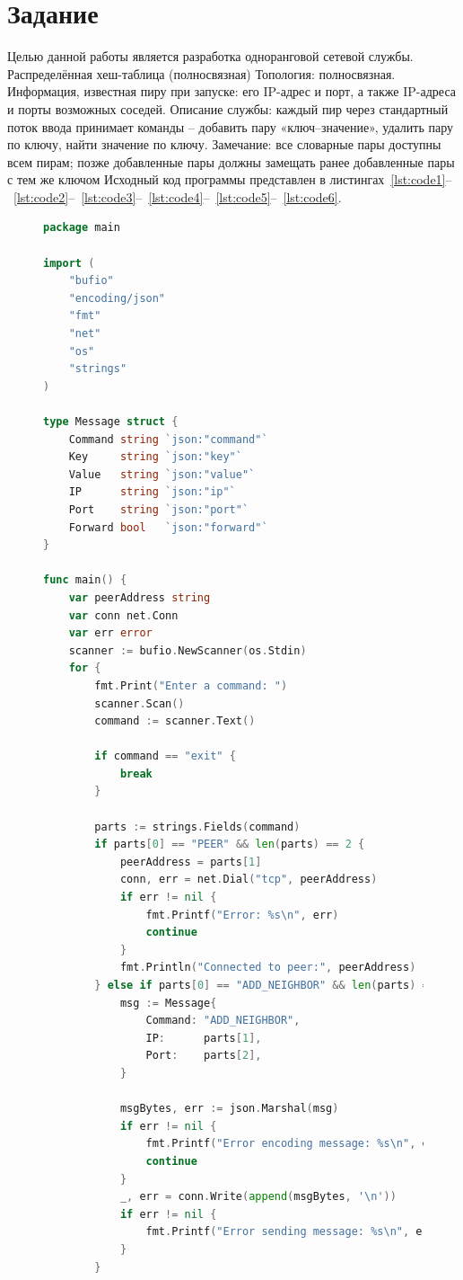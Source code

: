 \documentclass[a4paper, 14pt]{extarticle}
\begin{document}
\renewcommand{\ttdefault}{pcr}

\setlength{\tabcolsep}{3pt}
\newpage
\setcounter{page}{2}
\section{Задание}\label{Sect::task}
Целью данной работы является разработка одноранговой сетевой службы.
Распределённая хеш-таблица (полносвязная)
Топология: полносвязная.
Информация, известная пиру при запуске: его IP-адрес и порт,
а также IP-адреса и порты возможных соседей.
Описание службы: каждый пир через стандартный поток
ввода принимает команды – добавить пару «ключ–значение»,
удалить пару по ключу, найти значение по ключу.
Замечание: все словарные пары доступны всем пирам; позже
добавленные пары должны замещать ранее добавленные пары
с тем же ключом
Исходный код программы представлен в листингах~\ref{lst:code1}--~\ref{lst:code2}--~\ref{lst:code3}--~\ref{lst:code4}--~\ref{lst:code5}--~\ref{lst:code6}.

\begin{figure}[!htb]
\begin{lstlisting}[language={Go},caption={acces.go},label={lst:code1}]
package main

import (
	"bufio"
	"encoding/json"
	"fmt"
	"net"
	"os"
	"strings"
)

type Message struct {
	Command string `json:"command"`
	Key     string `json:"key"`
	Value   string `json:"value"`
	IP      string `json:"ip"`
	Port    string `json:"port"`
	Forward bool   `json:"forward"`
}

func main() {
	var peerAddress string
	var conn net.Conn
	var err error
	scanner := bufio.NewScanner(os.Stdin)
	for {
		fmt.Print("Enter a command: ")
		scanner.Scan()
		command := scanner.Text()

		if command == "exit" {
			break
		}

		parts := strings.Fields(command)
		if parts[0] == "PEER" && len(parts) == 2 {
			peerAddress = parts[1]
			conn, err = net.Dial("tcp", peerAddress)
			if err != nil {
				fmt.Printf("Error: %s\n", err)
				continue
			}
			fmt.Println("Connected to peer:", peerAddress)
		} else if parts[0] == "ADD_NEIGHBOR" && len(parts) == 3 {
			msg := Message{
				Command: "ADD_NEIGHBOR",
				IP:      parts[1],
				Port:    parts[2],
			}

			msgBytes, err := json.Marshal(msg)
			if err != nil {
				fmt.Printf("Error encoding message: %s\n", err)
				continue
			}
			_, err = conn.Write(append(msgBytes, '\n'))
			if err != nil {
				fmt.Printf("Error sending message: %s\n", err)
			}
		} 

\end{lstlisting}
\end{figure}
\end{document}
